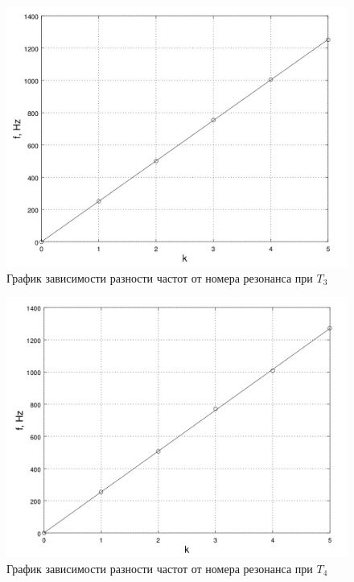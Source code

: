 \documentclass[20pt]{article}
\begin{document}
 \begin{figure}[H]
	\caption{График зависимости разности частот от номера резонанса при $T_3$}
	\center
	\includegraphics[scale=0.25]{T3.png}
\end{figure}
 \begin{figure}[H]
	\caption{График зависимости разности частот от номера резонанса при $T_4$}
	\center
	\includegraphics[scale=0.25]{T4.png}
\end{figure}
\end{document}
